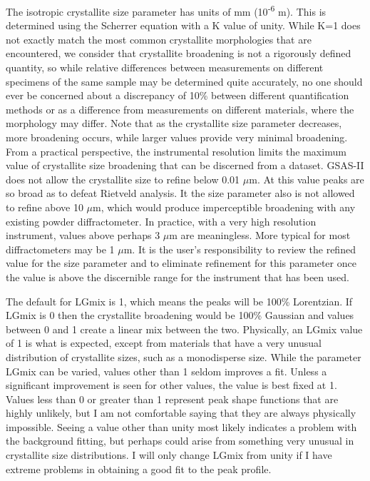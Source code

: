  The isotropic crystallite size parameter has units of mm (10\textsuperscript{-6} m). This is determined using the Scherrer equation with a K value of unity. While K=1 does not exactly match the most common crystallite morphologies that are encountered, we consider that crystallite broadening is not a rigorously defined quantity, so while relative differences between measurements on different specimens of the same sample may be determined quite accurately, no one should ever be concerned about a discrepancy of 10\% between different quantification methods or as a difference from measurements on different materials, where the morphology may differ. Note that as the crystallite size parameter decreases, more broadening occurs, while larger values provide very minimal broadening. From a practical perspective, the instrumental resolution limits the maximum value of crystallite size broadening that can be discerned from a dataset. 
 GSAS-II does not allow the crystallite size to refine below 0.01 $\mu$m. At this value peaks are so broad as to defeat Rietveld analysis. It the size parameter also is not allowed to refine above 10 $\mu$m, which would produce imperceptible broadening with any existing powder diffractometer. In practice, with a very high resolution instrument, values above perhaps 3 $\mu$m are meaningless. More typical for most diffractometers may be 1 $\mu$m. It is the user’s responsibility to review the refined value for the size parameter and to eliminate refinement for this parameter once the value is above the discernible range for the instrument that has been used.

 The default for LGmix is 1, which means the peaks will be 100\% Lorentzian. If LGmix is 0 then the crystallite broadening would be 100\% Gaussian and values between 0 and 1 create a linear mix between the two. Physically, an LGmix value of 1 is what is expected, except from materials that have a very unusual distribution of crystallite sizes, such as a monodisperse size. While the parameter LGmix can be varied, values other than 1 seldom improves a fit. Unless a significant improvement is seen for other values, the value is best fixed at 1. Values less than 0 or greater than 1 represent peak shape functions that are highly unlikely, but I am not comfortable saying that they are always physically impossible. Seeing a value other than unity most likely indicates a problem with the background fitting, but perhaps could arise from something very unusual in crystallite size distributions. I will only change LGmix from unity if I have extreme problems in obtaining a good fit to the peak profile. 

